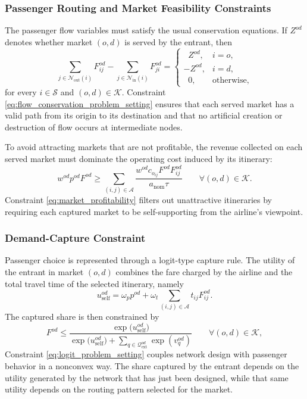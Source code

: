 \subsubsection{Passenger Routing and Market Feasibility Constraints}
The passenger flow variables must satisfy the usual conservation equations. If $Z^{od}$ denotes whether market $(o,d)$ is served by the entrant, then
\begin{equation}
\sum_{j\in\mathcal{N}_{\mathrm{out}}(i)} F_{ij}^{od}
- \sum_{j\in\mathcal{N}_{\mathrm{in}}(i)} F_{ji}^{od}
=
\begin{cases}
\;\; Z^{od}, & i=o,\\
- Z^{od}, & i=d,\\
\;\; 0, & \text{otherwise},
\end{cases}
\label{eq:flow_conservation_problem_setting}
\end{equation}
for every $i\in\mathcal{S}$ and $(o,d)\in\mathcal{K}$. Constraint \eqref{eq:flow_conservation_problem_setting} ensures that each served market has a valid path from its origin to its destination and that no artificial creation or destruction of flow occurs at intermediate nodes.

To avoid attracting markets that are not profitable, the revenue collected on each served market must dominate the operating cost induced by its itinerary:
\begin{equation}
w^{od}p^{od}F^{od}
\ge
\sum_{(i,j)\in\mathcal{A}}
\frac{w^{od}c_{o_{ij}}F^{od}F_{ij}^{od}}{a_{\mathrm{nom}}\tau}
\qquad \forall (o,d)\in\mathcal{K}.
\label{eq:market_profitability}
\end{equation}
Constraint \eqref{eq:market_profitability} filters out unattractive itineraries by requiring each captured market to be self-supporting from the airline's viewpoint.

\subsubsection{Demand-Capture Constraint}
Passenger choice is represented through a logit-type capture rule. The utility of the entrant in market $(o,d)$ combines the fare charged by the airline and the total travel time of the selected itinerary, namely
\begin{equation}
u^{od}_{\mathrm{self}}
=
\omega_p p^{od}
+ \omega_t \sum_{(i,j)\in\mathcal{A}} t_{ij}F_{ij}^{od}.
\label{eq:entrant_utility}
\end{equation}
The captured share is then constrained by
\begin{equation}
F^{od}
\le
\frac{\exp\bigl(u^{od}_{\mathrm{self}}\bigr)}
{\exp\bigl(u^{od}_{\mathrm{self}}\bigr)
+ \sum_{q\in\mathcal{Q}_{\mathrm{ext}}^{od}} \exp(v_q^{od})}
\qquad \forall (o,d)\in\mathcal{K},
\label{eq:logit_problem_setting}
\end{equation}
Constraint \eqref{eq:logit_problem_setting} couples network design with passenger behavior in a nonconvex way. The share captured by the entrant depends on the utility generated by the network that has just been designed, while that same utility depends on the routing pattern selected for the market.

